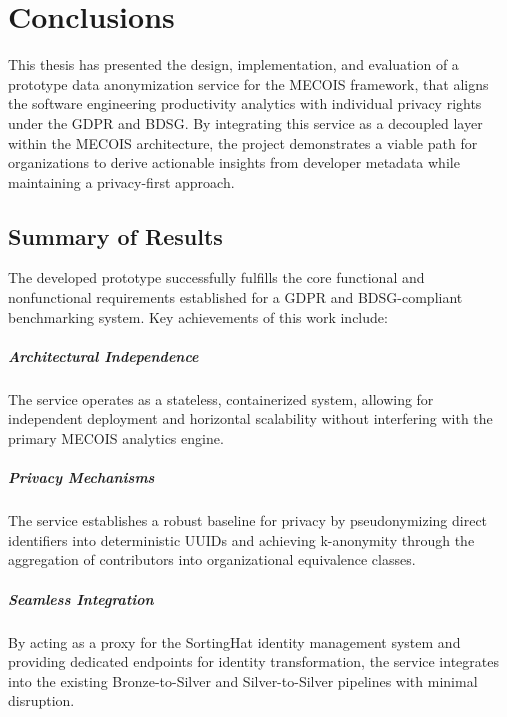 \chapter{Conclusions}
\label{chapter:conclusions}

This thesis has presented the design, implementation, and evaluation of a prototype data anonymization service for the MECOIS framework, that aligns the software engineering productivity analytics with individual privacy rights under the \ac{GDPR} and \ac{BDSG}. By integrating this service as a decoupled layer within the MECOIS architecture, the project demonstrates a viable path for organizations to derive actionable insights from developer metadata while maintaining a privacy-first approach.

\section{Summary of Results}

The developed prototype successfully fulfills the core functional and nonfunctional requirements established for a \ac{GDPR} and \ac{BDSG}-compliant benchmarking system. Key achievements of this work include:

\paragraph{Architectural Independence} The service operates as a stateless, containerized system, allowing for independent deployment and horizontal scalability without interfering with the primary MECOIS analytics engine.

\paragraph{Privacy Mechanisms} The service establishes a robust baseline for privacy by pseudonymizing direct identifiers into deterministic \acp{UUID} and achieving k-anonymity through the aggregation of contributors into organizational equivalence classes.

\paragraph{Seamless Integration} By acting as a proxy for the SortingHat identity management system and providing dedicated endpoints for identity transformation, the service integrates into the existing Bronze-to-Silver and Silver-to-Silver pipelines with minimal disruption.

